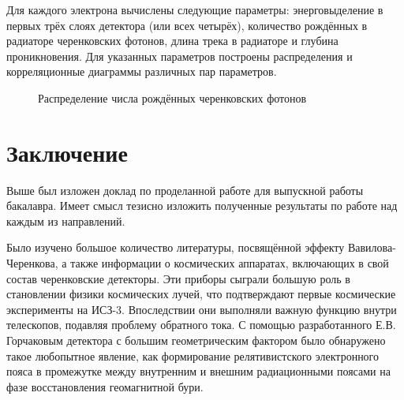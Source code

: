 \documentclass[12pt,a4paper]{report} %
\begin{document}
Для каждого электрона вычислены следующие параметры: энерговыделение в первых трёх слоях детектора (или всех четырёх), количество рождённых в радиаторе черенковских фотонов, длина трека в радиаторе и глубина проникновения. Для указанных параметров построены распределения и корреляционные диаграммы различных пар параметров. 
\begin{figure}[h!]
	\noindent{}
	\caption{Распределение числа рождённых черенковских фотонов}
	\label{CerHist}
\end{figure}
\chapter*{Заключение}
Выше был изложен доклад по проделанной работе для выпускной работы бакалавра. Имеет смысл тезисно изложить полученные результаты по работе над каждым из направлений.

Было изучено большое количество литературы, посвящённой эффекту Вавилова-Черенкова, а также информации о космических аппаратах, включающих в свой состав черенковские детекторы. Эти приборы сыграли большую роль в становлении физики космических лучей, что подтверждают первые космические эксперименты на ИСЗ-3. Впоследствии они выполняли важную функцию внутри телескопов, подавляя проблему обратного тока.
С помощью разработанного Е.В. Горчаковым детектора с большим геометрическим фактором было обнаружено такое любопытное явление, как формирование релятивистского электронного пояса в промежутке между внутренним и внешним радиационными поясами на фазе восстановления геомагнитной бури. 
\end{document}
